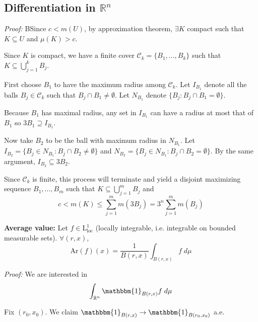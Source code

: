 \documentclass[12pt]{report}
\newcommand{\R}{\mathbb{R}}
\newcommand{\ind}{\mathbbm{1}}
\newcommand{\Cc}{\mathcal{C}}
\renewcommand{\L}{\text{L}}
\newcommand{\sub}{\subseteq}
\newcommand*{\tbf}[1]{\ifmmode\mathbf{#1}\else\textbf{#1}\fi}
\newenvironment*{tbox}[2][gray]{
    \begin{tcolorbox}[
        parbox=false,
        colback=#1!5!white,
        colframe=#1!75!black,
        breakable,
        title={#2}
    ]}
    {\end{tcolorbox}}
\begin{document}
\subsection*{Differentiation in $\R^n$}
    \begin{tbox}{\textbf{Vitali Covering Lemma:} Let $\Cc$ be a collection of open balls in $\R^n$ and $U = \bigcup_{B \in \Cc} B$. If $c < m(U)$, then $\exists \{B_j\}_{j=1}^k \in \Cc$ disjoint such that 
        \[\sum_{j=1}^k m(B_j) > 3^{-n}c\]}
        \emph{Proof:} BSince $c < m(U)$, by approximation theorem, $\exists K$ compact such that $K \sub U$ and $\mu(K) > c$. 

        Since $K$ is compact, we have a finite cover $\Cc_k = \{B_1, \dots, B_k\}$ such that $K \sub \bigcup_{j=1}^k B_j$. 

        First choose $B_1$ to have the maximum radius among $\Cc_k$. Let $I_{B_1}$ denote all the balls $B_j \in \Cc_k$ such that $B_j \cap B_1 \neq \emptyset$. Let $N_{B_1}$ denote $\{B_j: B_j \cap B_1 = \emptyset\}$.

        Because $B_1$ has maximal radius, any set in $I_{B_1}$ can have a radius at most that of $B_1$ so $3B_1 \supseteq I_{B_1}$. 

        Now take $B_2$ to be the ball with maximum radius in $N_{B_1}$. Let $I_{B_2} = \{B_j \in N_{B_1}: B_j \cap B_2 \neq \emptyset\}$ and $N_{B_2} = \{B_j \in N_{B_1}: B_j \cap B_2 = \emptyset\}$. By the same argument, $I_{B_2} \sub 3B_2$.

        Since $\Cc_k$ is finite, this process will terminate and yield a disjoint maximizing sequence $B_1, \dots, B_m$ such that $K \sub \bigcup_{j=1}^m B_j$ and
        \[c < m(K) \leq \sum_{j=1}^m m(3B_j) = 3^n \sum_{j=1}^m m(B_j)\]
    \end{tbox}

    \tbf{Average value:} Let $f \in \L^1_{\text{loc}}$ (locally integrable, i.e. integrable on bounded measurable sets). $\forall (r, x)$, 
    \[\text{Ar}(f)(x) = \frac{1}{B(r, x)} \int_{B(r, x)} f \; d\mu\]

    \begin{tbox}{\textbf{Lemma:} If $f\in \L^1_{\text{loc}}$, $\text{Ar}(f(x))$ is jointly continuous in $r$ and $x$ ($r > 0, x \in \R^n$)}
        \emph{Proof:} We are interested in 
        \[\int_{\R^n} \ind_{B(r, x)} f\; d\mu\]

        Fix $(r_0, x_0)$. We claim $\ind_{B(r, x)} \to \ind_{B(r_0, x_0)}$ a.e.
    \end{tbox}
\end{document}
